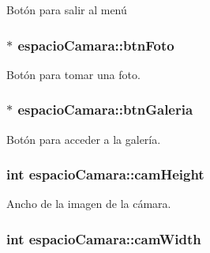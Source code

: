 Botón para salir al menú 

\hypertarget{classespacio_camara_a0a33e016b145a3ad2723d6d120260f48}{}
\subsubsection[{btn\+Foto}]{$\ast$ espacio\+Camara\+::btn\+Foto\hspace{0.3cm}{\ttfamily [private]}}\label{classespacio_camara_a0a33e016b145a3ad2723d6d120260f48}


Botón para tomar una foto. 

\hypertarget{classespacio_camara_a3d110b2810a8ba6579857dd7f8a6fe22}{}
\subsubsection[{btn\+Galeria}]{$\ast$ espacio\+Camara\+::btn\+Galeria\hspace{0.3cm}{\ttfamily [private]}}\label{classespacio_camara_a3d110b2810a8ba6579857dd7f8a6fe22}


Botón para acceder a la galería. 

\hypertarget{classespacio_camara_ac9c3980d5710ce9ae83a95a4e7d4bf3a}{}
\subsubsection[{cam\+Height}]{\setlength{\rightskip}{0pt plus 5cm}int espacio\+Camara\+::cam\+Height\hspace{0.3cm}{\ttfamily [private]}}\label{classespacio_camara_ac9c3980d5710ce9ae83a95a4e7d4bf3a}


Ancho de la imagen de la cámara. 

\hypertarget{classespacio_camara_aa357745006c6358ac4919ea079e80caa}{}
\subsubsection[{cam\+Width}]{\setlength{\rightskip}{0pt plus 5cm}int espacio\+Camara\+::cam\+Width\hspace{0.3cm}{\ttfamily [private]}}\label{classespacio_camara_aa357745006c6358ac4919ea079e80caa}


